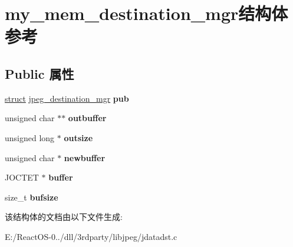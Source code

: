 \hypertarget{structmy__mem__destination__mgr}{}\section{my\+\_\+mem\+\_\+destination\+\_\+mgr结构体 参考}
\label{structmy__mem__destination__mgr}
\subsection*{Public 属性}
\begin{DoxyCompactItemize}
\item 
\mbox{\label{structmy__mem__destination__mgr_a5e0cd1a96147d183b7338007a7716961}} 
\hyperlink{interfacestruct}{struct} \hyperlink{structjpeg__destination__mgr}{jpeg\+\_\+destination\+\_\+mgr} {\bfseries pub}
\item 
\mbox{\label{structmy__mem__destination__mgr_a61dceebdaf153d422514527aa0e1bf6e}} 
unsigned char $\ast$$\ast$ {\bfseries outbuffer}
\item 
\mbox{\label{structmy__mem__destination__mgr_ac4bcefbee84e8b603a57dbb347cc2351}} 
unsigned long $\ast$ {\bfseries outsize}
\item 
\mbox{\label{structmy__mem__destination__mgr_ac0b918872c851937dd8751d1a8105220}} 
unsigned char $\ast$ {\bfseries newbuffer}
\item 
\mbox{\label{structmy__mem__destination__mgr_a183510a848f0a8d421a541df6ce6acac}} 
J\+O\+C\+T\+ET $\ast$ {\bfseries buffer}
\item 
\mbox{\label{structmy__mem__destination__mgr_a216685d583a991f4757f4e3f6a5de675}} 
size\+\_\+t {\bfseries bufsize}
\end{DoxyCompactItemize}


该结构体的文档由以下文件生成\+:\begin{DoxyCompactItemize}
\item 
E\+:/\+React\+O\+S-\/0../dll/3rdparty/libjpeg/jdatadst.\+c\end{DoxyCompactItemize}
